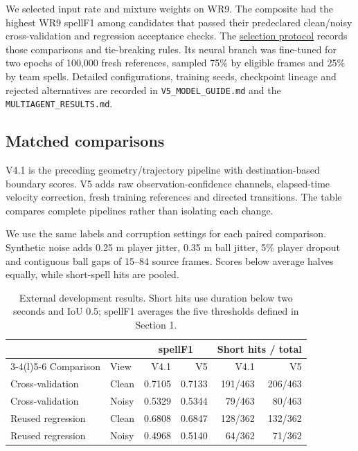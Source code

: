 \documentclass[11pt,a4paper]{article}
\begin{document}
We selected input rate and mixture weights on WR9. The composite had the highest
WR9 spellF1 among candidates that passed their predeclared clean/noisy
cross-validation and regression acceptance checks. The
\href{https://github.com/aqaPayam/Barca4Ever/blob/main/MULTIAGENT_SELECTION_PROTOCOL.md}{selection protocol}
records those comparisons and tie-breaking rules. Its neural branch was fine-tuned for two
epochs of 100,000 fresh references, sampled 75\% by eligible frames and 25\% by
team spells. Detailed configurations, training seeds, checkpoint lineage and
rejected alternatives are recorded in \texttt{V5\_MODEL\_GUIDE.md} and the
\texttt{MULTIAGENT\_RESULTS.md}.

\subsection{Matched comparisons}
V4.1 is the preceding geometry/trajectory pipeline with destination-based boundary
scores. V5 adds raw observation-confidence channels, elapsed-time velocity
correction, fresh training references and directed transitions. The table compares
complete pipelines rather than isolating each change.

We use the same labels and corruption settings for each paired comparison.
Synthetic noise adds 0.25 m player jitter, 0.35 m ball jitter, 5\% player dropout
and contiguous ball gaps of 15--84 source frames. Scores below average halves
equally, while short-spell hits are pooled.

\begin{table}[ht]
\centering
\begin{tabular}{@{}llrrrr@{}}
\toprule
 & & \multicolumn{2}{c}{spellF1} & \multicolumn{2}{c}{Short hits / total} \\
\cmidrule(lr){3-4}\cmidrule(l){5-6}
Comparison & View & V4.1 & V5 & V4.1 & V5 \\
\midrule
Cross-validation & Clean & 0.7105 & 0.7133 & 191/463 & 206/463 \\
Cross-validation & Noisy & 0.5329 & 0.5344 & 79/463 & 80/463 \\
Reused regression & Clean & 0.6808 & 0.6847 & 128/362 & 132/362 \\
Reused regression & Noisy & 0.4968 & 0.5140 & 64/362 & 71/362 \\
\bottomrule
\end{tabular}
\caption{External development results. Short hits use duration below two seconds
and IoU 0.5; spellF1 averages the five thresholds defined in Section 1.}
\label{tab:results}
\end{table}
\end{document}
